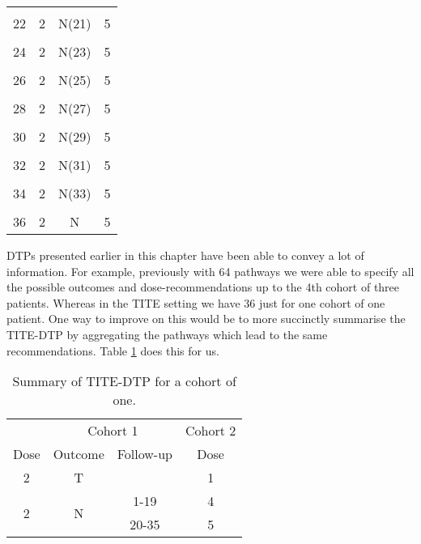 \begin{table}[H]
{\begin{tabular}[t]{cccc}
			\cellcolor{gray!6}{21} & \cellcolor{gray!6}{2} & \cellcolor{gray!6}{N(20)} & \cellcolor{gray!6}{5}\\
			22 & 2 & N(21) & 5\\
			\cellcolor{gray!6}{23} & \cellcolor{gray!6}{2} & \cellcolor{gray!6}{N(22)} & \cellcolor{gray!6}{5}\\
			24 & 2 & N(23) & 5\\
			\cellcolor{gray!6}{25} & \cellcolor{gray!6}{2} & \cellcolor{gray!6}{N(24)} & \cellcolor{gray!6}{5}\\
			26 & 2 & N(25) & 5\\
			\cellcolor{gray!6}{27} & \cellcolor{gray!6}{2} & \cellcolor{gray!6}{N(26)} & \cellcolor{gray!6}{5}\\
			28 & 2 & N(27) & 5\\
			\cellcolor{gray!6}{29} & \cellcolor{gray!6}{2} & \cellcolor{gray!6}{N(28)} & \cellcolor{gray!6}{5}\\
			30 & 2 & N(29) & 5\\
			\cellcolor{gray!6}{31} & \cellcolor{gray!6}{2} & \cellcolor{gray!6}{N(30)} & \cellcolor{gray!6}{5}\\
			32 & 2 & N(31) & 5\\
			\cellcolor{gray!6}{33} & \cellcolor{gray!6}{2} & \cellcolor{gray!6}{N(32)} & \cellcolor{gray!6}{5}\\
			34 & 2 & N(33) & 5\\
			\cellcolor{gray!6}{35} & \cellcolor{gray!6}{2} & \cellcolor{gray!6}{N(34)} & \cellcolor{gray!6}{5}\\
			36 & 2 & N & 5\\
			\bottomrule
	\end{tabular}}
\end{table}

DTPs presented earlier in this chapter have been able to convey a lot of information. For example, previously with 64 pathways we were able to specify all the possible outcomes and dose-recommendations up to the 4th cohort of three patients. Whereas in the TITE setting we have 36 just for one cohort of one patient. One way to improve on this would be to more succinctly summarise the TITE-DTP by aggregating the pathways which lead to the same recommendations. Table \ref{tab_tite-dtp:TITEDTP_c1_Sum} does this for us. 

\begin{table}[H]
	\centering
	\caption{Summary of TITE-DTP for a cohort of one.}
	\label{tab_tite-dtp:TITEDTP_c1_Sum}
	\begin{tabular}{cccc}
		\hline
		& \multicolumn{2}{c}{Cohort 1}   & Cohort 2 \\ \cline{2-4} 
		Dose               & Outcome            & Follow-up & Dose     \\ \hline
		2                  & T                  &           & 1        \\
		\multirow{2}{*}{2} & \multirow{2}{*}{N} & 1-19      & 4        \\
		&                    & 20-35     & 5        \\ \hline
	\end{tabular}
\end{table}

